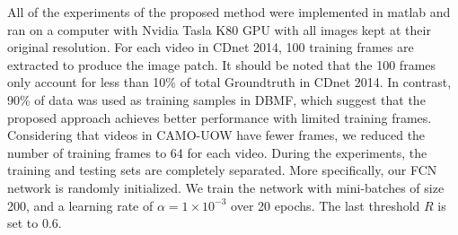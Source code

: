 \documentclass[journal]{IEEEtran}
\begin{document}
All of the experiments of the proposed method were implemented in matlab and ran on a computer with Nvidia Tasla K80 GPU with all images kept at their original resolution. 
For each video in CDnet 2014, 100 training frames are extracted to produce the image patch. 
It should be noted that the 100 frames only account for less than 10\% of total Groundtruth in CDnet 2014. 
In contrast, 90\% of data was used as training samples in DBMF, which suggest that the proposed approach achieves better performance with limited training frames. 
Considering that videos in CAMO-UOW have fewer frames, we reduced the number of training frames to 64 for each video. 
During the experiments, the training and testing sets are completely separated. 
More specifically, our FCN network is randomly initialized. 
We train the network with mini-batches of size 200, and a learning rate of $\alpha  = 1 \times 10^{{−3}}$ over 20 epochs. 
The last threshold $R$ is set to 0.6.


\end{document}
